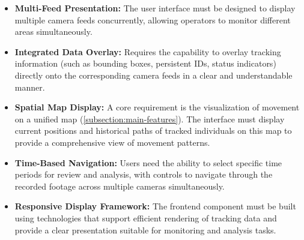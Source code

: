 \begin{itemize}[leftmargin=80pt]
    \item \textbf{Multi-Feed Presentation:} The user interface must be designed to display multiple camera feeds concurrently, allowing operators to monitor different areas simultaneously.
    \item \textbf{Integrated Data Overlay:} Requires the capability to overlay tracking information (such as bounding boxes, persistent IDs, status indicators) directly onto the corresponding camera feeds in a clear and understandable manner.
    \item \textbf{Spatial Map Display:} A core requirement is the visualization of movement on a unified map (\ref{subsection:main-features}). The interface must display current positions and historical paths of tracked individuals on this map to provide a comprehensive view of movement patterns.
    \item \textbf{Time-Based Navigation:} Users need the ability to select specific time periods for review and analysis, with controls to navigate through the recorded footage across multiple cameras simultaneously.
    \item \textbf{Responsive Display Framework:} The frontend component must be built using technologies that support efficient rendering of tracking data and provide a clear presentation suitable for monitoring and analysis tasks.
\end{itemize}